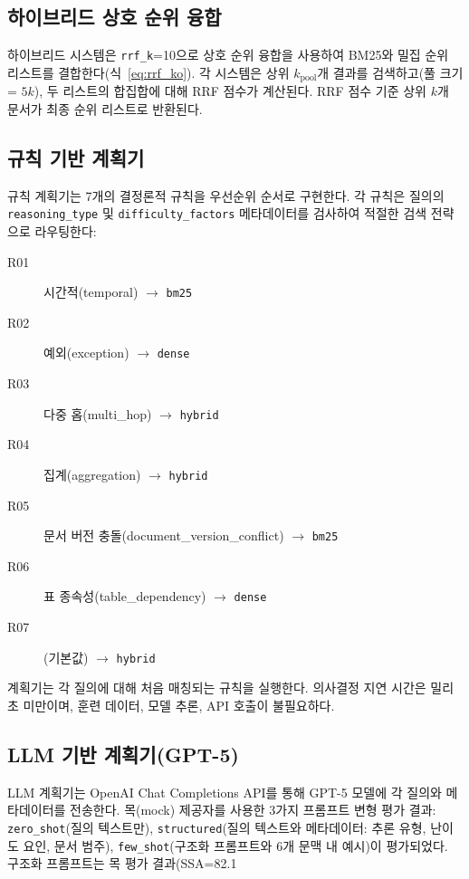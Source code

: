 \subsection{하이브리드 상호 순위 융합}

하이브리드 시스템은 \texttt{rrf\_k}{=}10으로 상호 순위 융합을 사용하여 BM25와 밀집 순위 리스트를 결합한다(식~\ref{eq:rrf_ko}). 각 시스템은 상위 $k_{\text{pool}}$개 결과를 검색하고(풀 크기 = $5k$), 두 리스트의 합집합에 대해 RRF 점수가 계산된다. RRF 점수 기준 상위 $k$개 문서가 최종 순위 리스트로 반환된다.

\subsection{규칙 기반 계획기}

규칙 계획기는 7개의 결정론적 규칙을 우선순위 순서로 구현한다. 각 규칙은 질의의 \texttt{reasoning\_type} 및 \texttt{difficulty\_factors} 메타데이터를 검사하여 적절한 검색 전략으로 라우팅한다:

\begin{description}
    \item[R01] 시간적(temporal) $\rightarrow$ \texttt{bm25}
    \item[R02] 예외(exception) $\rightarrow$ \texttt{dense}
    \item[R03] 다중 홉(multi\_hop) $\rightarrow$ \texttt{hybrid}
    \item[R04] 집계(aggregation) $\rightarrow$ \texttt{hybrid}
    \item[R05] 문서 버전 충돌(document\_version\_conflict) $\rightarrow$ \texttt{bm25}
    \item[R06] 표 종속성(table\_dependency) $\rightarrow$ \texttt{dense}
    \item[R07] (기본값) $\rightarrow$ \texttt{hybrid}
\end{description}

계획기는 각 질의에 대해 처음 매칭되는 규칙을 실행한다. 의사결정 지연 시간은 밀리초 미만이며, 훈련 데이터, 모델 추론, API 호출이 불필요하다.

\subsection{LLM 기반 계획기(GPT-5)}

LLM 계획기는 OpenAI Chat Completions API를 통해 GPT-5 모델에 각 질의와 메타데이터를 전송한다. 목(mock) 제공자를 사용한 3가지 프롬프트 변형 평가 결과: \texttt{zero\_shot}(질의 텍스트만), \texttt{structured}(질의 텍스트와 메타데이터: 추론 유형, 난이도 요인, 문서 범주), \texttt{few\_shot}(구조화 프롬프트와 6개 문맥 내 예시)이 평가되었다. 구조화 프롬프트는 목 평가 결과(SSA=82.1%

